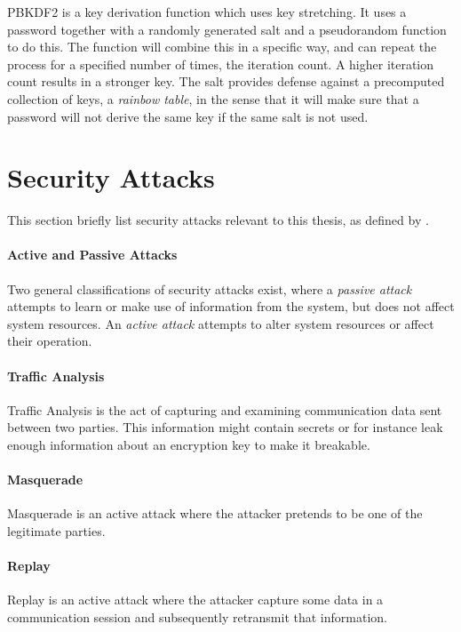 \documentclass[pdftex,english,10pt,b5paper,twoside]{book}
\begin{document}
\ac{PBKDF2} is a key derivation function which uses key stretching. It uses a
password together with a randomly generated salt and a pseudorandom function to
do this\cite{rfc2898}. The function will combine this in a specific way, and
can repeat the process for a specified number of times, the iteration count.
A higher iteration count results in a stronger key. The salt provides defense
against a precomputed collection of keys, a \emph{rainbow table}, in the sense
that it will make sure that a password will not derive the same key if the same
salt is not used.

\section{Security Attacks}

This section briefly list security attacks relevant to this thesis, as defined
by \citet[Ch. 1.3]{stallings}.

\paragraph{Active and Passive Attacks} Two general classifications of security
attacks exist, where a \emph{passive attack} attempts to learn or make use of
information from the system, but does not affect system resources. An
\emph{active attack} attempts to alter system resources or affect their
operation.

\paragraph{Traffic Analysis} Traffic Analysis is the act of capturing and
examining communication data sent between two parties. This information might
contain secrets or for instance leak enough information about an encryption key
to make it breakable.

\paragraph{Masquerade} Masquerade is an active attack where the attacker pretends to be
one of the legitimate parties.

\paragraph{Replay} Replay is an active attack where the attacker capture some
data in a communication session and subsequently retransmit that information.
\end{document}

